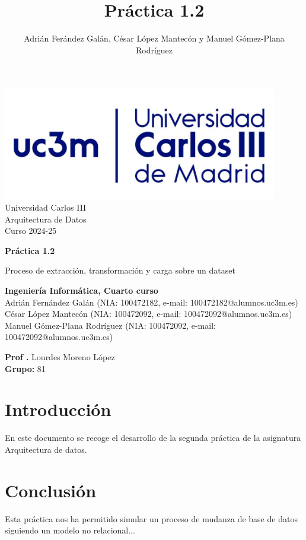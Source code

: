 \documentclass[]{article}
\title{Práctica 1.2}
\author{Adrián Ferández Galán, César López Mantecón y Manuel Gómez-Plana Rodríguez}
\begin{document}
\begin{titlepage}
    \centering
   \includegraphics[width=0.9\textwidth]{uc3m.jpg} 
    {\Huge Universidad Carlos III\\
    
     \Large Arquitectura de Datos\\
     \vspace{0.5cm}
     Curso 2024-25}
    \vspace{2cm}

    {\Huge \textbf{Práctica 1.2} \par}
    \vspace{0.5cm}
    {\Large Proceso de extracción, transformación y carga sobre un dataset \par}
    \vspace{8cm}

   \textbf{Ingeniería Informática, Cuarto curso}\\
    \vspace{0.2cm} 
    Adrián Fernández Galán       (NIA: 100472182, e-mail: 100472182@alumnos.uc3m.es)\\
    César López Mantecón         (NIA: 100472092, e-mail: 100472092@alumnos.uc3m.es)\\
    Manuel Gómez-Plana Rodríguez (NIA: 100472092, e-mail: 100472092@alumnos.uc3m.es)
    \vspace{0.5cm}

   
    \textbf{Prof .} Lourdes Moreno López\\
    
    \textbf{Grupo: } 81   
    
\end{titlepage}
\newpage

\renewcommand{\contentsname}{\centering Índice}
\tableofcontents

\newpage

\section{Introducción}
\label{sec:introduccion}
En este documento se recoge el desarrollo de la segunda práctica de la asignatura Arquitectura de datos. 
\newpage
\section{Conclusión}
\label{sec:conclusion}

Esta práctica nos ha permitido simular un proceso de mudanza de base de datos siguiendo un modelo no relacional...
\end{document}
